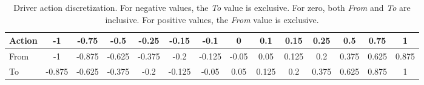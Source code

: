 \begin{table}[htbp]
\footnotesize
\centering
\centerfloat
\setlength{\tabcolsep}{3pt}
\begin{tabular}{@{}lccccccccccccc@{}}
\toprule
Action & -1     & -0.75  & -0.5   & -0.25  & -0.15  & -0.1   & 0     & 0.1   & 0.15  & 0.25  & 0.5   & 0.75  & 1 \\ \midrule
From   & -1   & -0.875 & -0.625 & -0.375 & -0.2   & -0.125 & -0.05 & 0.05  & 0.125 & 0.2   & 0.375 & 0.625 & 0.875 \\ 
To     & -0.875 & -0.625 & -0.375 & -0.2   & -0.125 & -0.05  & 0.05  & 0.125 & 0.2   & 0.375 & 0.625 & 0.875 & 1  \\ \bottomrule
\end{tabular}
\caption[Driver action discretization]{Driver action discretization. For negative values, the \emph{To} value is exclusive. For zero, both \emph{From} and \emph{To} are inclusive. For positive values, the \emph{From} value is exclusive.}
\label{tab:action_dist}
\end{table} 